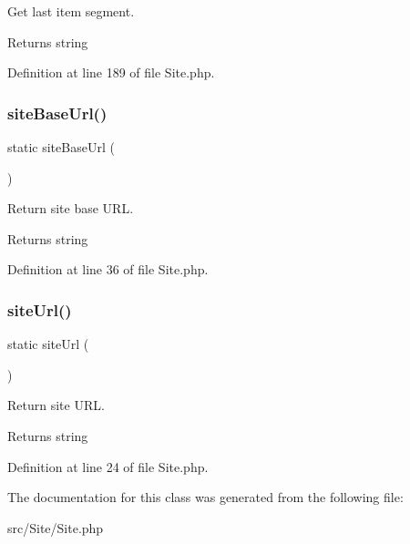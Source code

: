 Get last item segment.

\begin{DoxyReturn}{Returns}
string 
\end{DoxyReturn}


Definition at line 189 of file Site.\+php.

\mbox{\label{class_zest_1_1_site_1_1_site_a8f8d8d6d234b523abdc96f6a24339485}} 
\subsubsection{\texorpdfstring{site\+Base\+Url()}{siteBaseUrl()}}
{\footnotesize\ttfamily static site\+Base\+Url (\begin{DoxyParamCaption}{ }\end{DoxyParamCaption})\hspace{0.3cm}{\ttfamily [static]}}

Return site base U\+RL.

\begin{DoxyReturn}{Returns}
string 
\end{DoxyReturn}


Definition at line 36 of file Site.\+php.

\mbox{\label{class_zest_1_1_site_1_1_site_aabc6eeb791614306ddd00c2a7e4401ba}} 
\subsubsection{\texorpdfstring{site\+Url()}{siteUrl()}}
{\footnotesize\ttfamily static site\+Url (\begin{DoxyParamCaption}{ }\end{DoxyParamCaption})\hspace{0.3cm}{\ttfamily [static]}}

Return site U\+RL.

\begin{DoxyReturn}{Returns}
string 
\end{DoxyReturn}


Definition at line 24 of file Site.\+php.



The documentation for this class was generated from the following file\+:\begin{DoxyCompactItemize}
\item 
src/\+Site/Site.\+php\end{DoxyCompactItemize}
